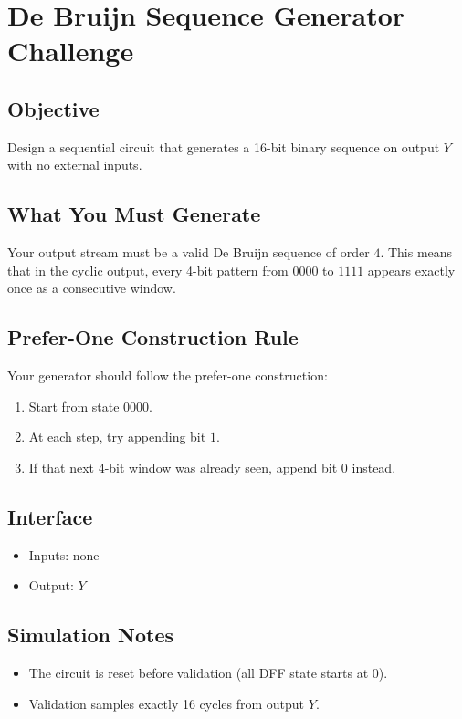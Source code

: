 \section*{De Bruijn Sequence Generator Challenge}

\subsection*{Objective}
Design a sequential circuit that generates a 16-bit binary sequence on output $Y$ with no external inputs.

\subsection*{What You Must Generate}
Your output stream must be a valid De Bruijn sequence of order $4$.
This means that in the cyclic output, every 4-bit pattern from $0000$ to $1111$ appears exactly once as a consecutive window.

\subsection*{Prefer-One Construction Rule}
Your generator should follow the prefer-one construction:
\begin{enumerate}
  \item Start from state $0000$.
  \item At each step, try appending bit $1$.
  \item If that next 4-bit window was already seen, append bit $0$ instead.
\end{enumerate}

\subsection*{Interface}
\begin{itemize}
  \item Inputs: none
  \item Output: $Y$
\end{itemize}

\subsection*{Simulation Notes}
\begin{itemize}
  \item The circuit is reset before validation (all DFF state starts at 0).
  \item Validation samples exactly 16 cycles from output $Y$.
\end{itemize}

